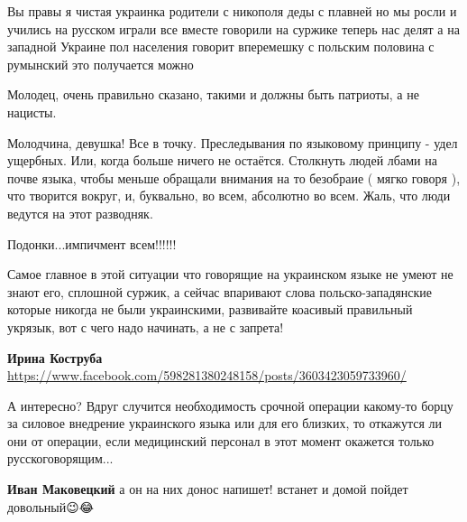 \begin{itemize}
Вы правы я чистая украинка родители с никополя деды с плавней но мы росли и
учились на русском играли все вместе говорили на суржике теперь нас делят а на
западной Украине пол населения говорит вперемешку с польским половина с
румынский это получается можно


Молодец, очень правильно сказано, такими и должны быть патриоты, а не нацисты.


Молодчина, девушка! Все в точку. Преследывания по языковому принципу - удел
ущербных. Или, когда больше ничего не остаётся. Столкнуть людей лбами на почве
языка, чтобы меньше обращали внимания на то безобраие ( мягко говоря ), что
творится вокруг, и, буквально, во всем, абсолютно во всем. Жаль, что люди
ведутся на этот разводняк.


Подонки...импичмент всем!!!!!!


Самое главное в этой ситуации что говорящие на украинском языке не умеют не
знают его, сплошной суржик, а сейчас впаривают слова польско-западянские
которые никогда не были украинскими, развивайте коасивый правильный укрязык,
вот с чего надо начинать, а не с запрета!

\begin{itemize}
\textbf{Ирина Коструба} \url{https://www.facebook.com/598281380248158/posts/3603423059733960/}
\end{itemize}


А интересно? Вдруг случится необходимость срочной операции какому-то борцу за
силовое внедрение украинского языка или для его близких, то откажутся ли они от
операции, если медицинский персонал в этот момент окажется только
русскоговорящим...



\begin{itemize}
\textbf{Иван Маковецкий} а он на них донос напишет! встанет и домой пойдет довольный😉😂


\end{itemize}
\end{itemize}
